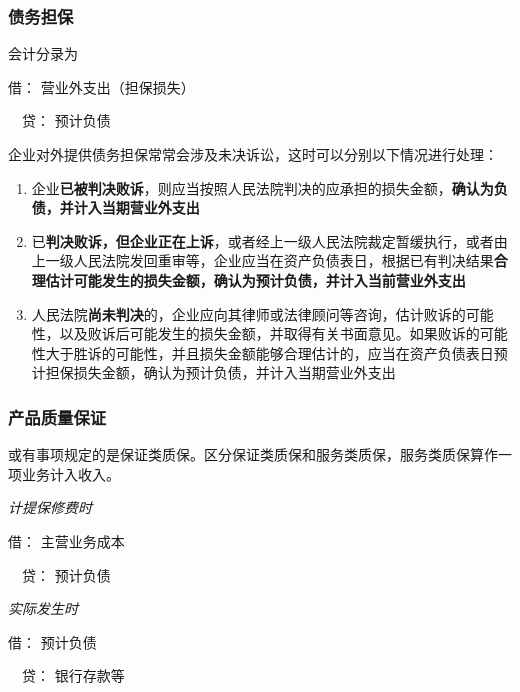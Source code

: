 \documentclass[UTF8,12pt]{ctexart}
\newenvironment{Dr}{\noindent 借：}{\par}
\newenvironment{Cr}{\noindent \ \ 贷：}{\par}
\numberwithin{equation}{section} %
\numberwithin{figure}{section}
\numberwithin{table}{section}
\begin{document}
	\subsubsection{债务担保}
	会计分录为
	
	\begin{Dr}
		营业外支出（担保损失）
	\end{Dr}
	\begin{Cr}
		预计负债
	\end{Cr}

	企业对外提供债务担保常常会涉及未决诉讼，这时可以分别以下情况进行处理：
	\begin{enumerate}
		\item 企业\textbf{已被判决败诉}，则应当按照人民法院判决的应承担的损失金额，\textbf{确认为负债，并计入当期营业外支出}
		
		\item 已\textbf{判决败诉，但企业正在上诉}，或者经上一级人民法院裁定暂缓执行，或者由上一级人民法院发回重审等，企业应当在资产负债表日，根据已有判决结果\textbf{合理估计可能发生的损失金额，确认为预计负债，并计入当前营业外支出}

		\item 人民法院\textbf{尚未判决}的，企业应向其律师或法律顾问等咨询，估计败诉的可能性，以及败诉后可能发生的损失金额，并取得有关书面意见。如果败诉的可能性大于胜诉的可能性，并且损失金额能够合理估计的，应当在资产负债表日预计担保损失金额，确认为预计负债，并计入当期营业外支出
	\end{enumerate}
	
	
	\subsubsection{产品质量保证}

	或有事项规定的是保证类质保。区分保证类质保和服务类质保，服务类质保算作一项业务计入收入。
	
	\textit{计提保修费时}
	
	\begin{Dr}
		主营业务成本
	\end{Dr}
	\begin{Cr}
		预计负债
	\end{Cr}
	
	\textit{实际发生时}
	
	\begin{Dr}
		预计负债
	\end{Dr}
	\begin{Cr}
		银行存款等
	\end{Cr}
	
\end{document}
